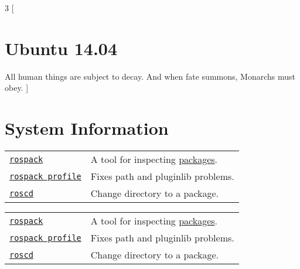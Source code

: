 \documentclass[10pt,landscape]{article}
\begin{document}
\begin{multicols}{3}
[
\section*{Ubuntu 14.04}
All human things are subject to decay. And when fate summons, Monarchs must obey.
]

\section*{System Information}
\vspace{-0.7em}
\begin{tabular}{l l}
\texttt{\href{http://wiki.ros.org/rospack}{rospack}} & A tool for inspecting \href{http://wiki.ros.org/Packages}{packages}. \\
\texttt{\href{http://docs.ros.org/independent/api/rospkg/html/rospack.html\#rospack-profile}{rospack profile}} & Fixes path and pluginlib problems. \\
\texttt{\href{http://wiki.ros.org/rosbash\#roscd}{roscd}} & Change directory to a package. \\
\end{tabular}

\vfill
\columnbreak

\begin{tabular}{l l}
\texttt{\href{http://wiki.ros.org/rospack}{rospack}} & A tool for inspecting \href{http://wiki.ros.org/Packages}{packages}. \\
\texttt{\href{http://docs.ros.org/independent/api/rospkg/html/rospack.html\#rospack-profile}{rospack profile}} & Fixes path and pluginlib problems. \\
\texttt{\href{http://wiki.ros.org/rosbash\#roscd}{roscd}} & Change directory to a package. \\
\end{tabular}

\vfill
\columnbreak


\end{multicols}
\end{document}
